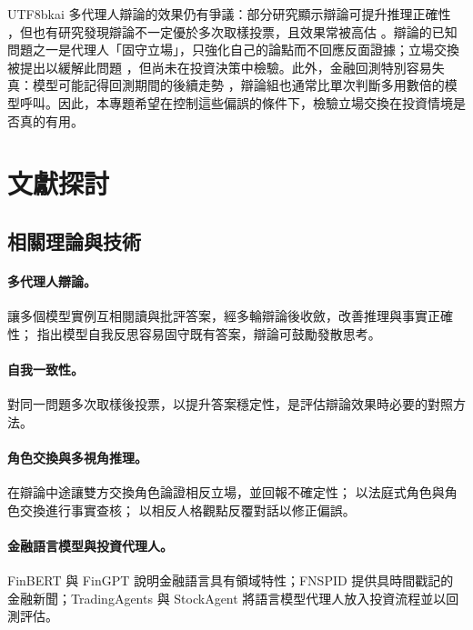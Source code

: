 \documentclass[12pt,a4paper]{article}
\begin{document}
\begin{CJK}{UTF8}{bkai}
多代理人辯論的效果仍有爭議：部分研究顯示辯論可提升推理正確性 \citep{du2023debate}，但也有研究發現辯論不一定優於多次取樣投票，且效果常被高估 \citep{smit2023mad,zhang2025stop}。辯論的已知問題之一是代理人「固守立場」，只強化自己的論點而不回應反面證據；立場交換被提出以緩解此問題 \citep{liu2025roleswitch,chowdhury2026proclaim}，但尚未在投資決策中檢驗。此外，金融回測特別容易失真：模型可能記得回測期間的後續走勢 \citep{glasserman2023lookahead,kong2026bias}，辯論組也通常比單次判斷多用數倍的模型呼叫。因此，本專題希望在控制這些偏誤的條件下，檢驗立場交換在投資情境是否真的有用。

\section{文獻探討}

\subsection{相關理論與技術}

\paragraph{多代理人辯論。} \citet{du2023debate} 讓多個模型實例互相閱讀與批評答案，經多輪辯論後收斂，改善推理與事實正確性；\citet{liang2023divergent} 指出模型自我反思容易固守既有答案，辯論可鼓勵發散思考。

\paragraph{自我一致性。} \citet{wang2023selfconsistency} 對同一問題多次取樣後投票，以提升答案穩定性，是評估辯論效果時必要的對照方法。

\paragraph{角色交換與多視角推理。} \citet{liu2025roleswitch} 在辯論中途讓雙方交換角色論證相反立場，並回報不確定性；\citet{chowdhury2026proclaim} 以法庭式角色與角色交換進行事實查核；\citet{chen2026mpt} 以相反人格觀點反覆對話以修正偏誤。

\paragraph{金融語言模型與投資代理人。} FinBERT \citep{araci2019finbert} 與 FinGPT \citep{liu2023fingpt} 說明金融語言具有領域特性；FNSPID \citep{dong2024fnspid} 提供具時間戳記的金融新聞；TradingAgents \citep{xiao2024tradingagents} 與 StockAgent \citep{zhang2024stockagent} 將語言模型代理人放入投資流程並以回測評估。


\end{CJK}
\end{document}
